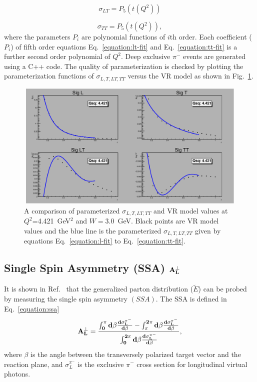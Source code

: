 \begin{equation}
        \sigma_{LT} = P_{5}(t(Q^2))        
     \label{equation:lt-fit}
\end{equation}

\begin{equation}
        \sigma_{TT} = P_{5}(t(Q^2)),        
     \label{equation:tt-fit}
\end{equation}
where the parameters $P_{i}$ are polynomial functions of $i$th order. Each
coefficient ($P_{i}$) of fifth order equations Eq.~\ref{equation:lt-fit} and
Eq.~\ref{equation:tt-fit} is a further second order polynomial of $Q^2$. Deep
exclusive $\pi^{-}$ events are generated using a C++ code. The quality of
parameterization is checked by plotting the parameterization functions of
$\sigma_{L,T,LT,TT}$ versus the VR model as shown in Fig.~\ref{fig:sigall}.

\begin{figure}[!hbt]
    \centering
    \includegraphics[width=6.0in,height=2.4in]{./figures/pimFit.pdf}
    \caption{A comparison of parameterized $\sigma_{L,T,LT,TT}$ and VR model
      values at $Q^2$=4.421~GeV$^2$ and $W=3.0$~GeV.  Black points are VR
      model values and the blue line is the parameterized $\sigma_{L,T,LT,TT}$
      given by equations Eq.~\ref{equation:l-fit} to
      Eq.~\ref{equation:tt-fit}.}
    \label{fig:sigall}
\end{figure}

\subsection{Single Spin Asymmetry (SSA) $\bf{A_{L}^{\perp}}$ }

It is shown in Ref.~\cite{Fr99} that the generalized parton distribution
($\tilde{E}$) can be probed by measuring the single spin asymmetry $(SSA)$. The
SSA is defined in Eq.~\ref{equation:ssa}
\begin{equation}
  \bf{A_{L}^{\perp}} =
  \frac{\int^{\pi}_{0}d\beta\frac{d\sigma_{L}^{\pi^{-}}}{d\beta} -
    \int^{2\pi}_{\pi}d\beta\frac{d\sigma_{L}^{\pi^{-}}}{d\beta} }
       {\int^{2\pi}_{0}d\beta\frac{d\sigma_{L}^{\pi^{-}}}{d\beta}},
     \label{equation:ssa}
\end{equation}
where $\beta$ is the angle between
the transversely polarized target vector and the reaction plane, and
$\sigma_{L}^{\pi^{-}}$ is the exclusive $\pi^{-}$ cross section for
longitudinal virtual photons.

